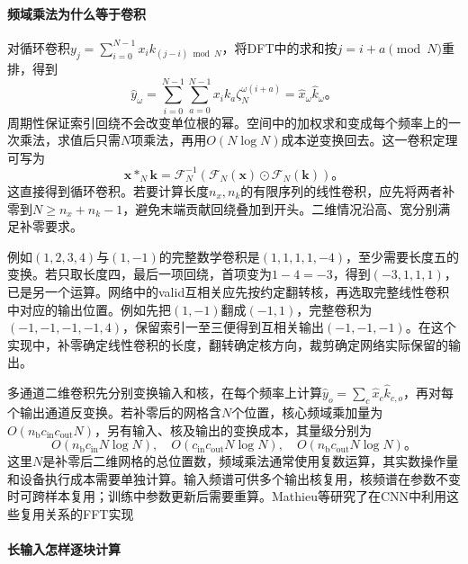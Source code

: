 \paragraph{频域乘法为什么等于卷积}

对循环卷积$y_j=\sum_{i=0}^{N-1}x_i k_{(j-i)\bmod N}$，将DFT中的求和按$j=i+a\pmod N$重排，得到
\begin{equation}
  \widehat y_\omega
    =\sum_{i=0}^{N-1}\sum_{a=0}^{N-1}
        x_i k_a\zeta_N^{\omega(i+a)}
    =\widehat x_\omega\widehat k_\omega\text{。}
  \label{eq:cnn-convolution-theorem-derivation}
\end{equation}
周期性保证索引回绕不会改变单位根的幂。空间中的加权求和变成每个频率上的一次乘法，求值后只需$N$项乘法，再用$O(N\log N)$成本逆变换回去。这一卷积定理可写为
\begin{equation}
  \bm x*_N\bm k=\mathcal F_N^{-1}
       \!\left(\mathcal F_N(\bm x)\odot\mathcal F_N(\bm k)\right)\text{。}
  \label{eq:cnn-fft-convolution}
\end{equation}
这直接得到循环卷积。若要计算长度$n_x,n_k$的有限序列的线性卷积，应先将两者补零到$N\geq n_x+n_k-1$，避免末端贡献回绕叠加到开头。二维情况沿高、宽分别满足补零要求。

例如$(1,2,3,4)$与$(1,-1)$的完整数学卷积是$(1,1,1,1,-4)$，至少需要长度五的变换。若只取长度四，最后一项回绕，首项变为$1-4=-3$，得到$(-3,1,1,1)$，已是另一个运算。网络中的valid互相关应先按约定翻转核，再选取完整线性卷积中对应的输出位置。例如先把$(1,-1)$翻成$(-1,1)$，完整卷积为$(-1,-1,-1,-1,4)$，保留索引一至三便得到互相关输出$(-1,-1,-1)$。在这个实现中，补零确定线性卷积的长度，翻转确定核方向，裁剪确定网络实际保留的输出。

多通道二维卷积先分别变换输入和核，在每个频率上计算$\widehat y_o=\sum_c\widehat x_c\widehat k_{c,o}$，再对每个输出通道反变换。若补零后的网格含$N$个位置，核心频域乘加量为$O(n_{\mathrm b}c_{\mathrm{in}}c_{\mathrm{out}}N)$，另有输入、核及输出的变换成本，其量级分别为
\[
  O(n_{\mathrm b}c_{\mathrm{in}}N\log N),\quad
  O(c_{\mathrm{in}}c_{\mathrm{out}}N\log N),\quad
  O(n_{\mathrm b}c_{\mathrm{out}}N\log N)\text{。}
\]
这里$N$是补零后二维网格的总位置数，频域乘法通常使用复数运算，其实数操作量和设备执行成本需要单独计算。输入频谱可供多个输出核复用，核频谱在参数不变时可跨样本复用；训练中参数更新后需要重算。Mathieu等研究了在CNN中利用这些复用关系的FFT实现

\paragraph{长输入怎样逐块计算}

